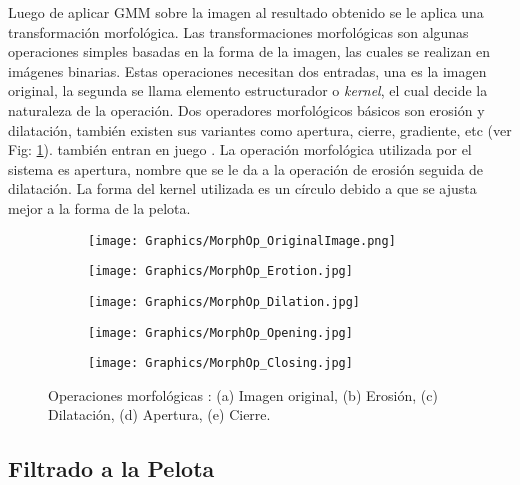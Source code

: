 Luego de aplicar GMM sobre la imagen al resultado obtenido se le aplica una transformación morfológica. Las transformaciones morfológicas son algunas operaciones simples basadas en la forma de la imagen, las cuales se realizan en imágenes binarias. Estas operaciones necesitan dos entradas, una es la imagen original, la segunda se llama elemento estructurador o \textit{kernel}, el cual decide la naturaleza de la operación. Dos operadores morfológicos básicos son erosión y dilatación, también existen sus variantes como apertura, cierre, gradiente, etc (ver Fig: \ref{fig:MorphOp}). también entran en juego \cite{MorphologicalTransformationsOpenCV}. La operación morfológica utilizada por el sistema es apertura, nombre que se le da a la operación de erosión seguida de dilatación. La forma del kernel utilizada es un círculo debido a que se ajusta mejor a la forma de la pelota.

\begin{figure}[h!]
	\centering
	\begin{subfigure}[b]{0.32\linewidth}
		\centering
		\texttt{[image: Graphics/MorphOp\_OriginalImage.png]}
		\caption{}
	\end{subfigure}
	\begin{subfigure}[b]{0.32\linewidth}
		\centering
		\texttt{[image: Graphics/MorphOp\_Erotion.jpg]}
		\caption{}
	\end{subfigure}
	\begin{subfigure}[b]{0.32\linewidth}
		\centering
		\texttt{[image: Graphics/MorphOp\_Dilation.jpg]}
		\caption{}
	\end{subfigure}
	\begin{subfigure}[b]{0.32\linewidth}
		\centering
		\texttt{[image: Graphics/MorphOp\_Opening.jpg]}
		\caption{}
	\end{subfigure}
	\begin{subfigure}[b]{0.32\linewidth}
		\centering
		\texttt{[image: Graphics/MorphOp\_Closing.jpg]}
		\caption{}
	\end{subfigure}
	\caption{Operaciones morfológicas : (a) Imagen original, (b) Erosión, (c) Dilatación, (d) Apertura, (e) Cierre.}
	\label{fig:MorphOp}
\end{figure}

\subsection{Filtrado a la Pelota}

